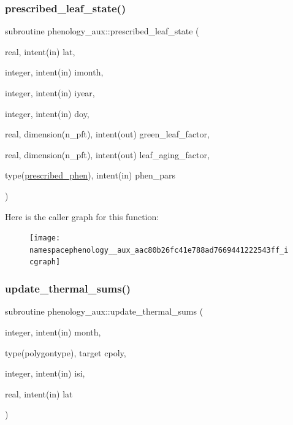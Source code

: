 \subsubsection{\texorpdfstring{prescribed\+\_\+leaf\+\_\+state()}{prescribed\_leaf\_state()}}
{\footnotesize\ttfamily subroutine phenology\+\_\+aux\+::prescribed\+\_\+leaf\+\_\+state (\begin{DoxyParamCaption}\item[{real, intent(in)}]{lat,  }\item[{integer, intent(in)}]{imonth,  }\item[{integer, intent(in)}]{iyear,  }\item[{integer, intent(in)}]{doy,  }\item[{real, dimension(n\+\_\+pft), intent(out)}]{green\+\_\+leaf\+\_\+factor,  }\item[{real, dimension(n\+\_\+pft), intent(out)}]{leaf\+\_\+aging\+\_\+factor,  }\item[{type(\hyperlink{structphenology__coms_1_1prescribed__phen}{prescribed\+\_\+phen}), intent(in)}]{phen\+\_\+pars }\end{DoxyParamCaption})}

Here is the caller graph for this function\+:
\nopagebreak
\begin{figure}[H]
\begin{center}
\leavevmode
\texttt{[image: namespacephenology\_\_aux\_aac80b26fc41e788ad7669441222543ff\_icgraph]}
\end{center}
\end{figure}
\mbox{\label{namespacephenology__aux_a227cf46507f7976ea4dd53e724e157c0}} 
\subsubsection{\texorpdfstring{update\+\_\+thermal\+\_\+sums()}{update\_thermal\_sums()}}
{\footnotesize\ttfamily subroutine phenology\+\_\+aux\+::update\+\_\+thermal\+\_\+sums (\begin{DoxyParamCaption}\item[{integer, intent(in)}]{month,  }\item[{type(polygontype), target}]{cpoly,  }\item[{integer, intent(in)}]{isi,  }\item[{real, intent(in)}]{lat }\end{DoxyParamCaption})}

